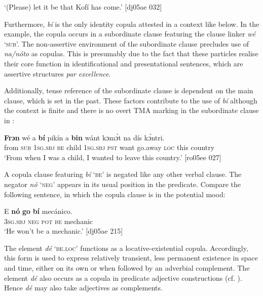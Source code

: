 \glt ‘(Please) let it be that Kofí has come.’ [dj05ae 032]
\z

Furthermore, \textit{bí} is the only identity copula attested in a context like  below. In the example, the copula occurs in a subordinate clause featuring the clause linker \textit{wé} ‘\textsc{sub}’. The non-assertive environment of the subordinate clause precludes use of \textit{na}\textit{\textup{/}}\textit{nóto} as copulas. This is presumably due to the fact that these particles realise their core function in identificational and presentational sentences, which are assertive structures \textit{par} \textit{excellence}. 


Additionally, tense reference of the subordinate clause is dependent on the main clause, which is set in the past. These factors contribute to the use of \textit{bí} although the context is finite and there is no overt TMA marking in the subordinate clause in :



\ea%
    \label{ex:key:777}
    \gll \textbf{Frɔn}  wé  a    \textbf{bí}  pikín  a    \textbf{bin}  wánt
kɔmɔ́t  na  dís  kɔ́ntri.\\
from  \textsc{sub}  \textsc{1sg.sbj}  \textsc{be}  child  \textsc{1sg.sbj}  \textsc{pst}  want
go.away  \textsc{loc}  this  country\\

\glt ‘From when I was a child, I wanted to leave this country.’ [ro05ee 027]
\z

A copula clause featuring \textit{bí} ‘\textsc{be’} is negated like any other verbal clause. The negator \textit{nó} ‘\textsc{neg}’ appears in its usual position in the predicate. Compare the following sentence, in which the copula clause is in the potential mood:


\ea%
    \label{ex:key:778}
    \gll E    \textbf{nó}  \textbf{go}  \textbf{bí}  mecánico.\\
\textsc{3sg.sbj}  \textsc{neg}  \textsc{pot}  \textsc{be}  mechanic\\

\glt ‘He won’t be a mechanic.’ [dj05ae 215]
\z

The element \textit{dé} \textsc{‘be.loc’} functions as a locative-existential copula. Accordingly, this form is used to express relatively transient, less permanent existence in space and time, either on its own or when followed by an adverbial complement. The element \textit{dé} also occurs as a copula in predicate adjective constructions (cf. ). Hence \textit{dé} may also take adjectives as complements. 


